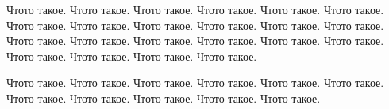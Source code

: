 
Чтото такое. 
Чтото такое. 
Чтото такое. Чтото такое. Чтото такое. Чтото такое. Чтото такое. 
Чтото такое. Чтото такое. Чтото такое. Чтото такое. Чтото такое. Чтото такое. Чтото такое.
 Чтото такое. Чтото такое. Чтото такое. Чтото такое. Чтото такое. Чтото такое. Чтото такое. Чтото такое. 

Чтото такое. Чтото такое. Чтото такое. Чтото такое. Чтото такое. Чтото такое. Чтото такое. Чтото такое. Чтото такое. Чтото такое. Чтото такое. 

\clearpage